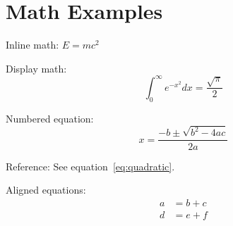 \documentclass{article}
\begin{document}
\section{Math Examples}

Inline math: $E = mc^2$

Display math:
\[
\int_0^\infty e^{-x^2} dx = \frac{\sqrt{\pi}}{2}
\]

Numbered equation:
\begin{equation}
\label{eq:quadratic}
x = \frac{-b \pm \sqrt{b^2 - 4ac}}{2a}
\end{equation}

Reference: See equation~\ref{eq:quadratic}.

Aligned equations:
\begin{align}
a &= b + c \\
d &= e + f
\end{align}
\end{document}
